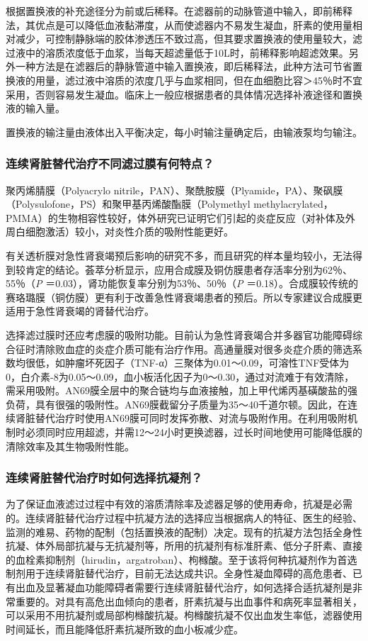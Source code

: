根据置换液的补充途径分为前或后稀释。在滤器前的动脉管道中输入，即前稀释法，其优点是可以降低血液黏滞度，从而使滤器内不易发生凝血，肝素的使用量相对减少，可控制静脉端的胶体渗透压不致过高，但其要求置换液的使用量较大，滤过液中的溶质浓度低于血浆，当每天超滤量低于10L时，前稀释影响超滤效果。另外一种方法是在滤器后的静脉管道中输入置换液，即后稀释法，此种方法可节省置换液的用量，滤过液中溶质的浓度几乎与血浆相同，但在血细胞比容＞45％时不宜采用，否则容易发生凝血。临床上一般应根据患者的具体情况选择补液途径和置换液的输入量。

置换液的输注量由液体出入平衡决定，每小时输注量确定后，由输液泵均匀输注。

\subsubsection{连续肾脏替代治疗不同滤过膜有何特点？}

聚丙烯腈膜（Polyacrylo
nitrile，PAN）、聚酰胺膜（Plyamide，PA）、聚砜膜（Polysulofone，PS）和聚甲基丙烯酸酯膜（Polymethyl
methylacrylated，PMMA）的生物相容性较好，体外研究已证明它们引起的炎症反应（对补体及外周白细胞激活）较小，对炎性介质的吸附性能更好。

有关透析膜对急性肾衰竭预后影响的研究不多，而且研究的样本量均较小，无法得到较肯定的结论。荟萃分析显示，应用合成膜及铜仿膜患者存活率分别为62％、55％（\emph{P}
＝0.03），肾功能恢复率分别为53％、50％（\emph{P}
＝0.18）。合成膜较传统的赛珞璐膜（铜仿膜）更有利于改善急性肾衰竭患者的预后。所以专家建议合成膜更适用于急性肾衰竭的肾替代治疗。

选择滤过膜时还应考虑膜的吸附功能。目前认为急性肾衰竭合并多器官功能障碍综合征时清除败血症的炎症介质可能有治疗作用。高通量膜对很多炎症介质的筛选系数均很低，如肿瘤坏死因子（TNF-α）三聚体为0.01～0.09，可溶性TNF受体为0，白介素-8为0.05～0.09，血小板活化因子为0～0.30，通过对流难于有效清除，需采用吸附。AN69膜全层中的聚合链均与血液接触，加上甲代烯丙基磺酸盐的强负荷，具有很强的吸附性。AN69膜截留分子质量为35～40千道尔顿。因此，在连续肾脏替代治疗时使用AN69膜可同时发挥弥散、对流与吸附作用。在利用吸附机制时必须同时应用超滤，并需12～24小时更换滤器，过长时间地使用可能降低膜的清除效率及其生物吸附性能。

\subsubsection{连续肾脏替代治疗时如何选择抗凝剂？}

为了保证血液滤过过程中有效的溶质清除率及滤器足够的使用寿命，抗凝是必需的。连续肾脏替代治疗过程中抗凝方法的选择应当根据病人的特征、医生的经验、监测的难易、药物的配制（包括置换液的配制）决定。现有的抗凝方法包括全身性抗凝、体外局部抗凝与无抗凝剂等，所用的抗凝剂有标准肝素、低分子肝素、直接的血栓素抑制剂（hirudin，argatroban）、枸橼酸。至于该将何种抗凝剂作为首选制剂用于连续肾脏替代治疗，目前无法达成共识。全身性凝血障碍的高危患者、已有出血及显著凝血功能障碍者需要行连续肾脏替代治疗，如何选择合适抗凝剂是非常重要的。对具有高危出血倾向的患者，肝素抗凝与出血事件和病死率显著相关，可以采用不用抗凝剂或局部枸橼酸抗凝。枸橼酸抗凝不仅出血发生率低，滤器使用时间延长，而且能降低肝素抗凝所致的血小板减少症。

